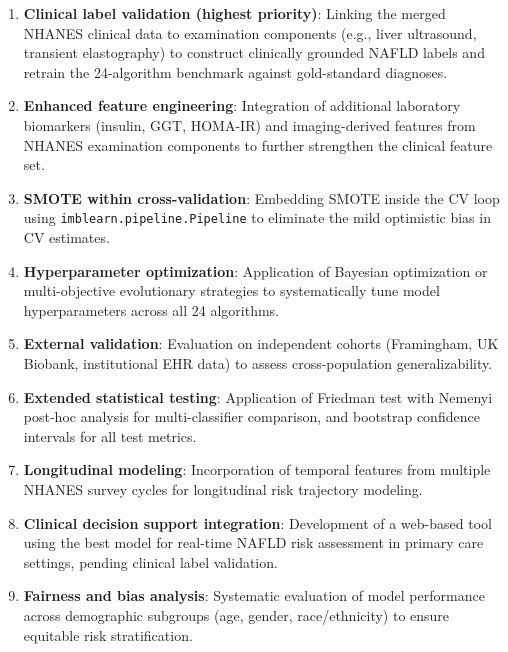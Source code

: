 \documentclass[conference,10pt]{IEEEtran}
\begin{document}
\begin{enumerate}
    \item \textbf{Clinical label validation (highest priority)}: Linking the merged NHANES clinical data to examination components (e.g., liver ultrasound, transient elastography) to construct clinically grounded NAFLD labels and retrain the 24-algorithm benchmark against gold-standard diagnoses.

    \item \textbf{Enhanced feature engineering}: Integration of additional laboratory biomarkers (insulin, GGT, HOMA-IR) and imaging-derived features from NHANES examination components to further strengthen the clinical feature set.

    \item \textbf{SMOTE within cross-validation}: Embedding SMOTE inside the CV loop using \texttt{imblearn.pipeline.Pipeline} to eliminate the mild optimistic bias in CV estimates.

    \item \textbf{Hyperparameter optimization}: Application of Bayesian optimization or multi-objective evolutionary strategies to systematically tune model hyperparameters across all 24 algorithms.

    \item \textbf{External validation}: Evaluation on independent cohorts (Framingham, UK Biobank, institutional EHR data) to assess cross-population generalizability.

    \item \textbf{Extended statistical testing}: Application of Friedman test with Nemenyi post-hoc analysis for multi-classifier comparison, and bootstrap confidence intervals for all test metrics.

    \item \textbf{Longitudinal modeling}: Incorporation of temporal features from multiple NHANES survey cycles for longitudinal risk trajectory modeling.

    \item \textbf{Clinical decision support integration}: Development of a web-based tool using the best model for real-time NAFLD risk assessment in primary care settings, pending clinical label validation.

    \item \textbf{Fairness and bias analysis}: Systematic evaluation of model performance across demographic subgroups (age, gender, race/ethnicity) to ensure equitable risk stratification.
\end{enumerate}
\end{document}
